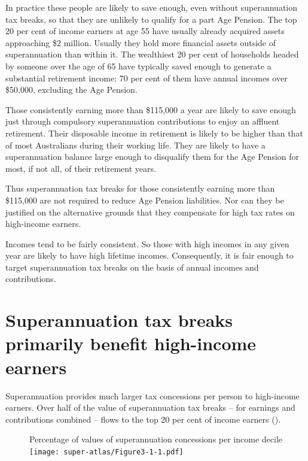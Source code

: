 In practice these people are likely to save enough, even without superannuation tax breaks, so that they are unlikely to qualify for a part Age Pension. The top 20 per cent of income earners at age 55 have usually already acquired assets approaching \$2 million. Usually they hold more financial assets outside of superannuation than within it. The wealthiest 20 per cent of households headed by someone over the age of 65 have typically saved enough to generate a substantial retirement income: 70 per cent of them have annual incomes over \$50,000, excluding the Age Pension.

Those consistently earning more than \$115,000 a year are likely to save enough just through compulsory superannuation contributions to enjoy an affluent retirement. Their disposable income in retirement is likely to be higher than that of most Australians during their working life. They are likely to have a superannuation balance large enough to disqualify them for the Age Pension for most, if not all, of their retirement years. 

Thus superannuation tax breaks for those consistently earning more than \$115,000 are not required to reduce Age Pension liabilities. Nor can they be justified on the alternative grounds that they compensate for high tax rates on high-income earners.

Incomes tend to be fairly consistent. So those with high incomes in any given year are likely to have high lifetime incomes. Consequently, it is fair enough to target superannuation tax breaks on the basis of annual incomes and contributions.

\section{Superannuation tax breaks primarily benefit high-income earners}
Superannuation provides much larger tax concessions per person to high-income earners. Over half of the value of superannuation tax breaks – for earnings and contributions combined – flows to the top 20 per cent of income earners ().

\oneraggedpage

\begin{figure}[!b]
%
{Percentage of values of superannuation concessions per income decile}\label{fig:SUPER-3-1}
\texttt{[image: super-atlas/Figure3-1-1.pdf]}

\end{figure}

